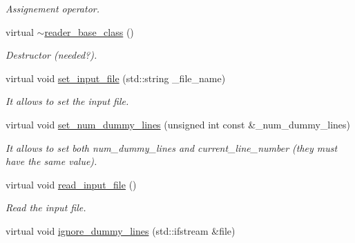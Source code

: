 \begin{DoxyCompactItemize}
\begin{DoxyCompactList}\small\item\em Assignement operator. \item\end{DoxyCompactList}\item 
\hypertarget{classreader__base__class_a001ba0a21c6099f0fc58acabe8852491}{
virtual \hyperlink{classreader__base__class_a001ba0a21c6099f0fc58acabe8852491}{$\sim$reader\_\-base\_\-class} ()}
\label{classreader__base__class_a001ba0a21c6099f0fc58acabe8852491}

\begin{DoxyCompactList}\small\item\em Destructor (needed?). \item\end{DoxyCompactList}\item 
\hypertarget{classreader__base__class_a5020c9b926b79bf1d9958215498d9e50}{
virtual void \hyperlink{classreader__base__class_a5020c9b926b79bf1d9958215498d9e50}{set\_\-input\_\-file} (std::string \_\-file\_\-name)}
\label{classreader__base__class_a5020c9b926b79bf1d9958215498d9e50}

\begin{DoxyCompactList}\small\item\em It allows to set the input file. \item\end{DoxyCompactList}\item 
\hypertarget{classreader__base__class_ac30077974d31badd9205f39f928e085f}{
virtual void \hyperlink{classreader__base__class_ac30077974d31badd9205f39f928e085f}{set\_\-num\_\-dummy\_\-lines} (unsigned int const \&\_\-num\_\-dummy\_\-lines)}
\label{classreader__base__class_ac30077974d31badd9205f39f928e085f}

\begin{DoxyCompactList}\small\item\em It allows to set both num\_\-dummy\_\-lines and current\_\-line\_\-number (they must have the same value). \item\end{DoxyCompactList}\item 
\hypertarget{classreader__base__class_ac6d07ef07127e4b172ccfac4e7aabda3}{
virtual void \hyperlink{classreader__base__class_ac6d07ef07127e4b172ccfac4e7aabda3}{read\_\-input\_\-file} ()}
\label{classreader__base__class_ac6d07ef07127e4b172ccfac4e7aabda3}

\begin{DoxyCompactList}\small\item\em Read the input file. \item\end{DoxyCompactList}\item 
\hypertarget{classreader__base__class_aced9ab4a76f00617de238ded83d4f873}{
virtual void \hyperlink{classreader__base__class_aced9ab4a76f00617de238ded83d4f873}{ignore\_\-dummy\_\-lines} (std::ifstream \&file)}
\label{classreader__base__class_aced9ab4a76f00617de238ded83d4f873}


\end{DoxyCompactItemize}
